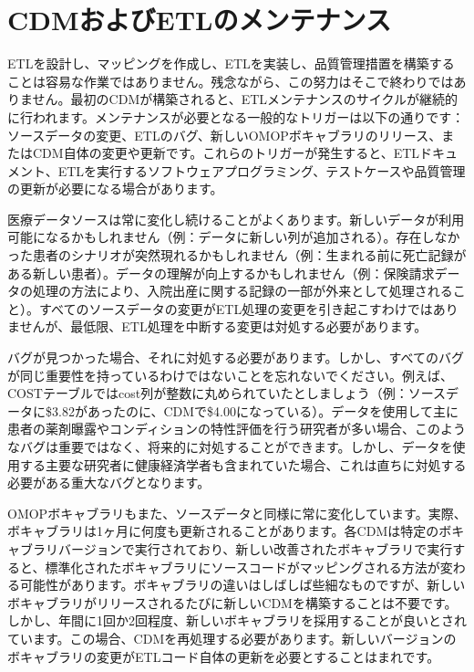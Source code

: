\documentclass[
  11pt]{book}
\theoremstyle{definition}
\theoremstyle{definition}
\theoremstyle{definition}
\theoremstyle{definition}
\theoremstyle{remark}
\begin{document}
\section{CDMおよびETLのメンテナンス}\label{CDMandETLMaintenance}

ETLを設計し、マッピングを作成し、ETLを実装し、品質管理措置を構築することは容易な作業ではありません。残念ながら、この努力はそこで終わりではありません。最初のCDMが構築されると、ETLメンテナンスのサイクルが継続的に行われます。メンテナンスが必要となる一般的なトリガーは以下の通りです：ソースデータの変更、ETLのバグ、新しいOMOPボキャブラリのリリース、またはCDM自体の変更や更新です。これらのトリガーが発生すると、ETLドキュメント、ETLを実行するソフトウェアプログラミング、テストケースや品質管理の更新が必要になる場合があります。

医療データソースは常に変化し続けることがよくあります。新しいデータが利用可能になるかもしれません（例：データに新しい列が追加される）。存在しなかった患者のシナリオが突然現れるかもしれません（例：生まれる前に死亡記録がある新しい患者）。データの理解が向上するかもしれません（例：保険請求データの処理の方法により、入院出産に関する記録の一部が外来として処理されること）。すべてのソースデータの変更がETL処理の変更を引き起こすわけではありませんが、最低限、ETL処理を中断する変更は対処する必要があります。

バグが見つかった場合、それに対処する必要があります。しかし、すべてのバグが同じ重要性を持っているわけではないことを忘れないでください。例えば、COSTテーブルではcost列が整数に丸められていたとしましょう（例：ソースデータに\$3.82があったのに、CDMで\$4.00になっている）。データを使用して主に患者の薬剤曝露やコンディションの特性評価を行う研究者が多い場合、このようなバグは重要ではなく、将来的に対処することができます。しかし、データを使用する主要な研究者に健康経済学者も含まれていた場合、これは直ちに対処する必要がある重大なバグとなります。

OMOPボキャブラリもまた、ソースデータと同様に常に変化しています。実際、ボキャブラリは1ヶ月に何度も更新されることがあります。各CDMは特定のボキャブラリバージョンで実行されており、新しい改善されたボキャブラリで実行すると、標準化されたボキャブラリにソースコードがマッピングされる方法が変わる可能性があります。ボキャブラリの違いはしばしば些細なものですが、新しいボキャブラリがリリースされるたびに新しいCDMを構築することは不要です。しかし、年間に1回か2回程度、新しいボキャブラリを採用することが良いとされています。この場合、CDMを再処理する必要があります。新しいバージョンのボキャブラリの変更がETLコード自体の更新を必要とすることはまれです。
\end{document}
